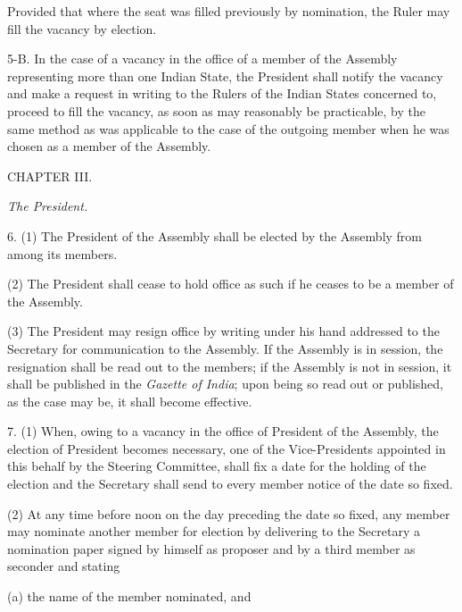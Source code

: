 Provided that where the seat was filled previously by nomination, the Ruler may fill the vacancy by election.



5-B. In the case of a vacancy in the office of a member of the Assembly representing more than one Indian State, the President shall notify the vacancy and make a request in writing to the Rulers of the Indian States concerned to, proceed to fill the vacancy, as soon as may reasonably be practicable, by the same method as was applicable to the case of the outgoing member when he was chosen as a member of the Assembly.



\begin{center}
CHAPTER III.\end{center}
\begin{center}
\emph{The President.}\end{center}


6. (1) The President of the Assembly shall be elected by the Assembly from among its members.



(2) The President shall cease to hold office as such if he ceases to be a member of the Assembly.



(3) The President may resign office by writing under his hand addressed to the Secretary for communication to the Assembly. If the Assembly is in session, the resignation shall be read out to the members; if the Assembly is not in session, it shall be published in the \emph{Gazette of India}; upon being so read out or published, as the case may be, it shall become effective.



7. (1) When, owing to a vacancy in the office of President of the Assembly, the election of President becomes necessary, one of the Vice-Presidents appointed in this behalf by the Steering Committee, shall fix a date for the holding of the election and the Secretary shall send to every member notice of the date so fixed.



(2) At any time before noon on the day preceding the date so fixed, any member may nominate another member for election by delivering to the Secretary a nomination paper signed by himself as proposer and by a third member as seconder and stating\textemdash{}



(a) the name of the member nominated, and

